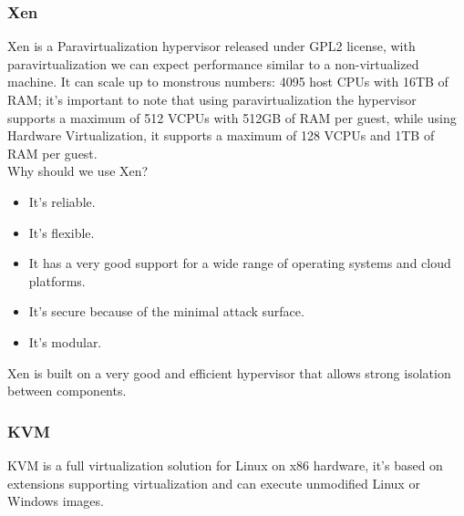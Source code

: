 \subsubsection{Xen}
Xen is a Paravirtualization hypervisor released under GPL2 license, with paravirtualization we can expect performance similar to a non-virtualized machine. It can scale up to monstrous numbers: 4095 host CPUs with 16TB of RAM; it's important to note that using paravirtualization the hypervisor supports a maximum of 512 VCPUs with 512GB of RAM per guest, while using Hardware Virtualization, it supports a maximum of 128 VCPUs and 1TB of RAM per guest. \\
Why should we use Xen?
\begin{itemize}
    \item It's reliable.
    \item It's flexible.
    \item It has a very good support for a wide range of operating systems and cloud platforms.
    \item It's secure because of the minimal attack surface.
    \item It's modular.
\end{itemize}
Xen is built on a very good and efficient hypervisor that allows strong isolation between components.
\subsubsection{KVM}
KVM is a full virtualization solution for Linux on x86 hardware, it's based on extensions supporting virtualization and can execute unmodified Linux or Windows images.
